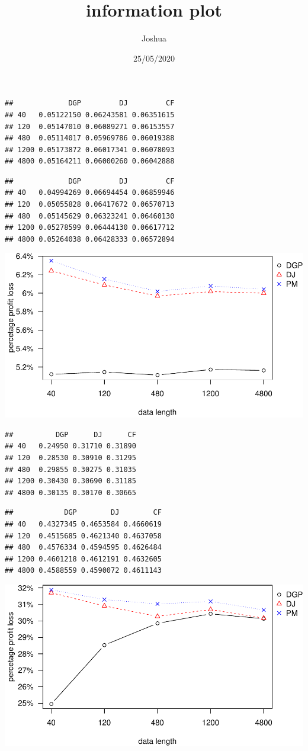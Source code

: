 \documentclass[
]{article}
\title{information plot}
\author{Joshua}
\date{25/05/2020}
\begin{document}
\maketitle

\begin{verbatim}
##             DGP         DJ         CF
## 40   0.05122150 0.06243581 0.06351615
## 120  0.05147010 0.06089271 0.06153557
## 480  0.05114017 0.05969786 0.06019388
## 1200 0.05173872 0.06017341 0.06078093
## 4800 0.05164211 0.06000260 0.06042888
\end{verbatim}

\begin{verbatim}
##             DGP         DJ         CF
## 40   0.04994269 0.06694454 0.06859946
## 120  0.05055828 0.06417672 0.06570713
## 480  0.05145629 0.06323241 0.06460130
## 1200 0.05278599 0.06444130 0.06617712
## 4800 0.05264038 0.06428333 0.06572894
\end{verbatim}

\includegraphics{information-plot_files/figure-latex/AR(1)ppl-1.pdf}

\begin{verbatim}
##          DGP      DJ      CF
## 40   0.24950 0.31710 0.31890
## 120  0.28530 0.30910 0.31295
## 480  0.29855 0.30275 0.31035
## 1200 0.30430 0.30690 0.31185
## 4800 0.30135 0.30170 0.30665
\end{verbatim}

\begin{verbatim}
##            DGP        DJ        CF
## 40   0.4327345 0.4653584 0.4660619
## 120  0.4515685 0.4621340 0.4637058
## 480  0.4576334 0.4594595 0.4626484
## 1200 0.4601218 0.4612191 0.4632605
## 4800 0.4588559 0.4590072 0.4611143
\end{verbatim}

\includegraphics{information-plot_files/figure-latex/AR(1)sl-1.pdf}
\end{document}
